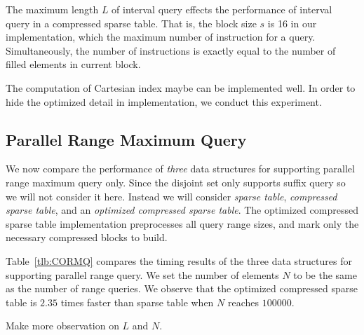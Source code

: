 
The maximum length $L$ of interval query effects the performance of
interval query in a compressed sparse table.   That is, the block size
$s$ is 16 in our implementation, which the maximum number of instruction
for a query.  Simultaneously, the number of instructions is exactly
equal to the number of filled elements in current block.


The computation of Cartesian index maybe can be implemented well.  In
order to hide the optimized detail in implementation, we conduct this
experiment.



\subsection{Parallel Range Maximum Query}

We now compare the performance of {\em three} data structures for
supporting parallel range maximum query only.  Since the disjoint set
only supports suffix query so we will not consider it here.  Instead
we will consider {\em sparse table}, {\em compressed sparse table},
and an {\em optimized compressed sparse table}.  The optimized
compressed sparse table implementation preprocesses all query range
sizes, and mark only the necessary compressed blocks to build.

Table~\ref{tlb:CORMQ} compares the timing results of the three data
structures for supporting parallel range query.  We set the number of
elements $N$ to be the same as the number of range queries.  We
observe that the optimized compressed sparse table is $2.35$ times
faster than sparse table when $N$ reaches $100000$.

Make more observation on $L$ and $N$.


